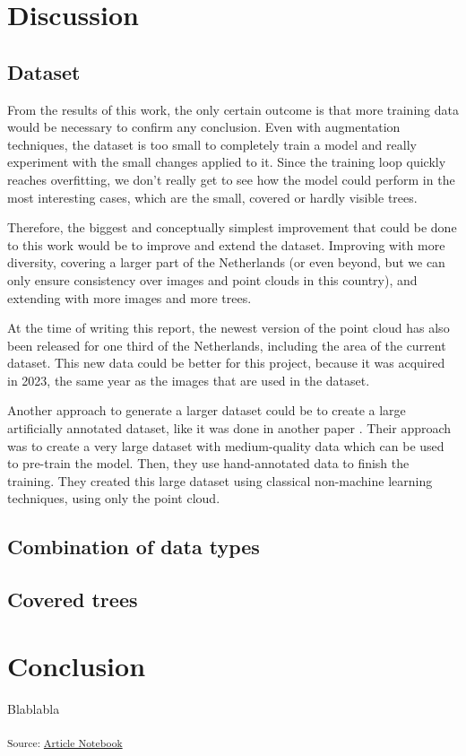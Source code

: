 \documentclass[
  letterpaper,
  DIV=11,
  numbers=noendperiod]{scrartcl}
\begin{document}
\section{Discussion}\label{discussion}

\subsection{Dataset}\label{dataset}

From the results of this work, the only certain outcome is that more
training data would be necessary to confirm any conclusion. Even with
augmentation techniques, the dataset is too small to completely train a
model and really experiment with the small changes applied to it. Since
the training loop quickly reaches overfitting, we don't really get to
see how the model could perform in the most interesting cases, which are
the small, covered or hardly visible trees.

Therefore, the biggest and conceptually simplest improvement that could
be done to this work would be to improve and extend the dataset.
Improving with more diversity, covering a larger part of the Netherlands
(or even beyond, but we can only ensure consistency over images and
point clouds in this country), and extending with more images and more
trees.

At the time of writing this report, the newest version of the point
cloud has also been released for one third of the Netherlands, including
the area of the current dataset. This new data could be better for this
project, because it was acquired in 2023, the same year as the images
that are used in the dataset.

Another approach to generate a larger dataset could be to create a large
artificially annotated dataset, like it was done in another paper
\autocite{DeepForest}. Their approach was to create a very large dataset
with medium-quality data which can be used to pre-train the model. Then,
they use hand-annotated data to finish the training. They created this
large dataset using classical non-machine learning techniques, using
only the point cloud.

\subsection{Combination of data types}\label{combination-of-data-types}

\subsection{Covered trees}\label{covered-trees}

\section*{Conclusion}\label{conclusion}

Blablabla

\textsubscript{Source:
\href{https://ZokszY.github.io/Geodan-internship-report/index-preview.html}{Article
Notebook}}


\printbibliography[title=Bibliography]
\end{document}
